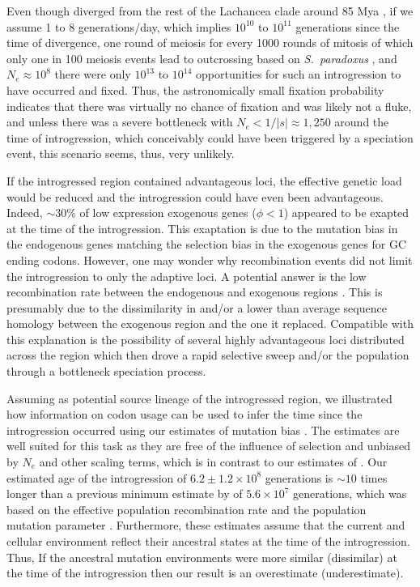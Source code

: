 \documentclass[fleqn,letterpaper]{article}
\begin{document}
Even though \kluyveri diverged from the rest of the Lachancea clade around 85 Mya \citep{kensche2008, MHM2015}, if we assume 1 to 8 generations/day, which implies $10^{10}$ to $10^{11}$ generations since the time of divergence, one round of meiosis for every 1000 rounds of mitosis of which only one in 100 meiosis events lead to outcrossing based on \emph{S.~paradoxus} \citep{tsai2008}, and $N_e \approx 10^8$ there were only $10^{13}$ to $10^{14}$ opportunities for such an introgression to have occurred and fixed.
Thus, the astronomically small fixation probability indicates that there was virtually no chance of fixation and was likely not a fluke, and unless there was a severe bottleneck with $N_e < 1/|s| \approx 1,250$ around the time of introgression, which conceivably could have been triggered by a speciation event, this scenario seems, thus, very unlikely.

If the introgressed region contained advantageous loci, the effective genetic load would be reduced and the introgression could have even been advantageous.
Indeed, $\sim 30 \%$ of low expression exogenous genes ($\phi < 1$) appeared to be exapted at the time of the introgression.
This exaptation is due to the mutation bias in the endogenous genes matching the selection bias in the exogenous genes for GC ending codons.
However, one may wonder why recombination events did not limit the introgression to only the adaptive loci.
A potential answer is the low recombination rate between the endogenous and exogenous regions \citet{payen2009, brion2017} .
This is presumably due to the dissimilarity in \GC and/or a lower than average sequence homology between the exogenous region and the one it replaced.
Compatible with this explanation is the possibility of several highly advantageous loci distributed across the region which then drove a rapid selective sweep and/or the population through a bottleneck speciation process.

Assuming \gossypii as potential source lineage of the introgressed region, we illustrated how information on codon usage can be used to infer the time since the introgression occurred using our estimates of mutation bias \DM.
The \DM estimates are well suited for this task as they are free of the influence of selection and unbiased by $N_e$ and other scaling terms, which is in contrast to our estimates of \DE \citep{gilchrist2015}.
Our estimated age of the introgression of $6.2\pm1.2\times 10^8$ generations is $\sim 10$ times longer than a previous minimum estimate by \citet{friedrich2015} of $5.6\times 10^7$ generations, which was based on the effective population recombination rate and the population mutation parameter \citep{Ruderfer2006}.
Furthermore, these estimates assume that the current \gossypii and \kluyveri cellular environment reflect their ancestral states at the time of the introgression.
Thus, If the ancestral mutation environments were more similar (dissimilar) at the time of the introgression then our result is an overestimate (underestimate).
\end{document}
